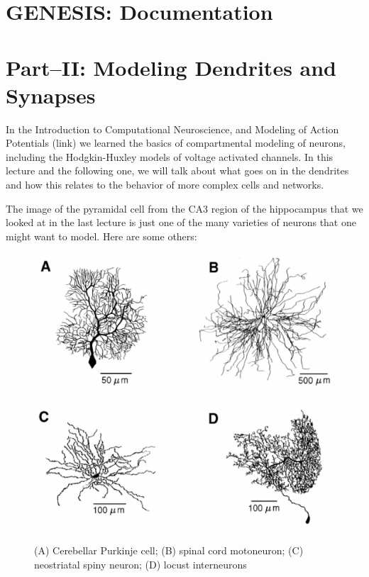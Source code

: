 \documentclass[12pt]{article}
\begin{document}
\section*{GENESIS: Documentation}

\section*{Part--II: Modeling Dendrites and Synapses}

In the Introduction to Computational Neuroscience, and Modeling of Action Potentials (link) we learned the basics of compartmental modeling of neurons, including the Hodgkin-Huxley models of voltage activated channels. In this lecture and the following one, we will talk about what goes on in the dendrites and how this relates to the behavior of more complex cells and networks.

The image of the pyramidal cell from the CA3 region of the hippocampus that we looked at in the last lecture is just one of the many varieties of neurons that one might want to model. Here are some others:

\begin{figure}[h]
  \centering
 \includegraphics[scale=0.4]{figures/BoGfig5_1s.eps}
  \caption{(A) Cerebellar Purkinje cell; (B) spinal cord motoneuron; (C) neostriatal spiny neuron; (D) locust interneurons}
  \label{fig:neurons}
\end{figure}
\end{document}
